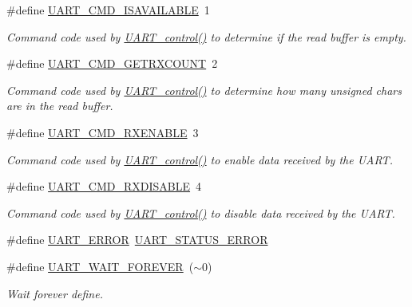 \begin{DoxyCompactItemize}
\#define \hyperlink{_u_a_r_t_8h_af5be6db621c5b048637dc93b26797693}{U\+A\+R\+T\+\_\+\+C\+M\+D\+\_\+\+I\+S\+A\+V\+A\+I\+L\+A\+B\+L\+E}~1
\begin{DoxyCompactList}\small\item\em Command code used by \hyperlink{_u_a_r_t_8h_a9de3c26cfe4ce6b7f350a6ea6e16801d}{U\+A\+R\+T\+\_\+control()} to determine if the read buffer is empty. \end{DoxyCompactList}\item 
\#define \hyperlink{_u_a_r_t_8h_a470321cbd9eccf137ffbe6553ae7f35f}{U\+A\+R\+T\+\_\+\+C\+M\+D\+\_\+\+G\+E\+T\+R\+X\+C\+O\+U\+N\+T}~2
\begin{DoxyCompactList}\small\item\em Command code used by \hyperlink{_u_a_r_t_8h_a9de3c26cfe4ce6b7f350a6ea6e16801d}{U\+A\+R\+T\+\_\+control()} to determine how many unsigned chars are in the read buffer. \end{DoxyCompactList}\item 
\#define \hyperlink{_u_a_r_t_8h_ad67d01fa376f25bb28141d819647e8d3}{U\+A\+R\+T\+\_\+\+C\+M\+D\+\_\+\+R\+X\+E\+N\+A\+B\+L\+E}~3
\begin{DoxyCompactList}\small\item\em Command code used by \hyperlink{_u_a_r_t_8h_a9de3c26cfe4ce6b7f350a6ea6e16801d}{U\+A\+R\+T\+\_\+control()} to enable data received by the U\+A\+R\+T. \end{DoxyCompactList}\item 
\#define \hyperlink{_u_a_r_t_8h_ac0b19ce2fa9f43d3fe255bcdbd3cda7b}{U\+A\+R\+T\+\_\+\+C\+M\+D\+\_\+\+R\+X\+D\+I\+S\+A\+B\+L\+E}~4
\begin{DoxyCompactList}\small\item\em Command code used by \hyperlink{_u_a_r_t_8h_a9de3c26cfe4ce6b7f350a6ea6e16801d}{U\+A\+R\+T\+\_\+control()} to disable data received by the U\+A\+R\+T. \end{DoxyCompactList}\item 
\#define \hyperlink{_u_a_r_t_8h_a7e3562e7931cf51b41a32d8109072251}{U\+A\+R\+T\+\_\+\+E\+R\+R\+O\+R}~\hyperlink{_u_a_r_t_8h_a2ae076f4aae13ca8e2aea674207df0ad}{U\+A\+R\+T\+\_\+\+S\+T\+A\+T\+U\+S\+\_\+\+E\+R\+R\+O\+R}
\item 
\#define \hyperlink{_u_a_r_t_8h_ada620b673241eb6335a71e75da291716}{U\+A\+R\+T\+\_\+\+W\+A\+I\+T\+\_\+\+F\+O\+R\+E\+V\+E\+R}~($\sim$0)
\begin{DoxyCompactList}\small\item\em Wait forever define. \end{DoxyCompactList}\end{DoxyCompactItemize}
